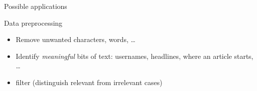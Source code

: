 \documentclass{beamer}
\begin{document}
%
%
%
%














\begin{frame}{Possible applications}
\begin{block}{Data preprocessing}
\begin{itemize}
\item Remove unwanted characters, words, \ldots
\item Identify \emph{meaningful} bits of text: usernames, headlines, where an article starts, \ldots
\item filter (distinguish relevant from irrelevant cases)
\end{itemize}
\end{block}
\end{frame}
\end{document}
